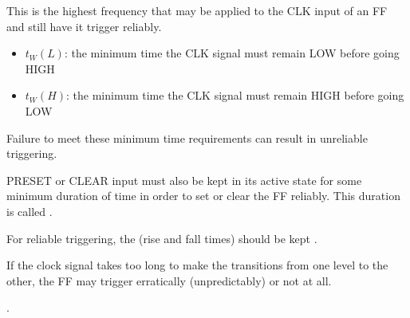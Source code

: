     \par This is the highest frequency that may be applied to the CLK input
    of an FF and still have it trigger reliably.

    \begin{itemize}
      \item $t_W (L)$: the minimum time the CLK signal must remain LOW before
        going HIGH
      \item $t_W (H)$: the minimum time the CLK signal must remain HIGH before
        going LOW
    \end{itemize}
    \par Failure to meet these minimum time requirements can result in
    unreliable triggering.
    \par {}

    \par PRESET or CLEAR input must also be kept in its active state for
    some minimum duration of time in order to set or clear the FF reliably.
    This duration is called .

    \par For reliable triggering, the 
      (rise and fall times) should be kept .
    \par If the clock signal takes too long to make the transitions from one
      level to the other, the FF may trigger erratically (unpredictably) or
      not at all.


  \par {}.